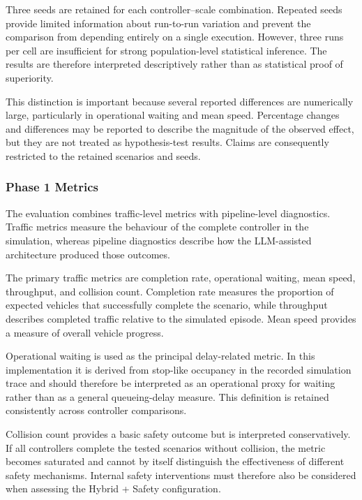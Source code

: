 \documentclass[letterpaper,10pt,conference]{ieeeconf}
\begin{document}
Three seeds are retained for each controller--scale combination. Repeated seeds provide limited information about run-to-run variation and prevent the comparison from depending entirely on a single execution. However, three runs per cell are insufficient for strong population-level statistical inference. The results are therefore interpreted descriptively rather than as statistical proof of superiority.



This distinction is important because several reported differences are numerically large, particularly in operational waiting and mean speed. Percentage changes and differences may be reported to describe the magnitude of the observed effect, but they are not treated as hypothesis-test results. Claims are consequently restricted to the retained scenarios and seeds.



\subsubsection{Phase 1 Metrics}



The evaluation combines traffic-level metrics with pipeline-level diagnostics. Traffic metrics measure the behaviour of the complete controller in the simulation, whereas pipeline diagnostics describe how the LLM-assisted architecture produced those outcomes.



The primary traffic metrics are completion rate, operational waiting, mean speed, throughput, and collision count. Completion rate measures the proportion of expected vehicles that successfully complete the scenario, while throughput describes completed traffic relative to the simulated episode. Mean speed provides a measure of overall vehicle progress.



Operational waiting is used as the principal delay-related metric. In this implementation it is derived from stop-like occupancy in the recorded simulation trace and should therefore be interpreted as an operational proxy for waiting rather than as a general queueing-delay measure. This definition is retained consistently across controller comparisons.



Collision count provides a basic safety outcome but is interpreted conservatively. If all controllers complete the tested scenarios without collision, the metric becomes saturated and cannot by itself distinguish the effectiveness of different safety mechanisms. Internal safety interventions must therefore also be considered when assessing the Hybrid + Safety configuration.
\end{document}
